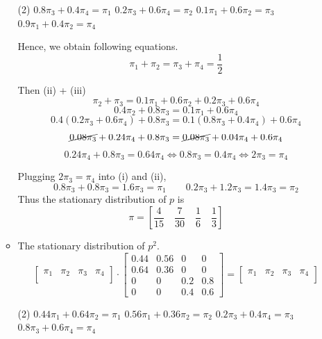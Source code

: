\documentclass[12pt]{article}
\begin{document}
\begin{enumerate}[label=(\alph*)]
\begin{itemize}
            \begin{tasks}(2)
        		\task $0.8\pi_3 + 0.4\pi_4 = \pi_1$
        		\task $0.2\pi_3 + 0.6\pi_4 = \pi_2$
        		\task $0.1\pi_1 + 0.6\pi_2 = \pi_3$
        		\task $0.9\pi_1 + 0.4\pi_2 = \pi_4$
        		
        	\end{tasks}
            
            Hence, we obtain following equations.
            $$\pi_1+\pi_2 = \pi_3+\pi_4 = \frac{1}{2}$$
            
            Then (ii) + (iii)
            $$\pi_2 + \pi_3 = 0.1\pi_1 + 0.6\pi_2 + 0.2\pi_3 + 0.6\pi_4$$
            $$0.4\pi_2 + 0.8\pi_3 = 0.1\pi_1 + 0.6\pi_4$$
            $$0.4(0.2\pi_3 + 0.6\pi_4) + 0.8\pi_3 = 0.1(0.8\pi_3 + 0.4\pi_4) + 0.6\pi_4$$
            $$\cancel{0.08\pi_3} + 0.24\pi_4 + 0.8\pi_3 = \cancel{0.08\pi_3} + 0.04\pi_4 + 0.6\pi_4$$
            $$0.24\pi_4 + 0.8\pi_3 = 0.64\pi_4 \Leftrightarrow 0.8\pi_3 = 0.4\pi_4 
            \Leftrightarrow 2\pi_3 = \pi_4$$
            
            Plugging $2\pi_3 = \pi_4$ into (i) and (ii),
            $$0.8\pi_3 + 0.8\pi_3 = 1.6\pi_3 = \pi_1 \qquad
            0.2\pi_3+1.2\pi_3 = 1.4\pi_3 = \pi_2
            $$
            Thus the stationary distribution of $p$ is
            $$\pi = \left[ \frac{4}{15}\quad \frac{7}{30}\quad \frac{1}{6}\quad \frac{1}{3} \right] $$
            \newpage
            \item The stationary distribution of $p^2$.\\
            
            $$
            \begin{bmatrix}
                \pi_1&\pi_2&\pi_3&\pi_4\\
            \end{bmatrix}
            \cdot 
            \begin{bmatrix}
                0.44&0.56&0&0\\
                0.64&0.36&0&0\\
                0&0&0.2&0.8\\
                0&0&0.4&0.6
            \end{bmatrix}
            =
            \begin{bmatrix}
                \pi_1&\pi_2&\pi_3&\pi_4\\
            \end{bmatrix}   
            $$
            \begin{tasks}(2)
        		\task $0.44\pi_1 + 0.64\pi_2 = \pi_1$
        		\task $0.56\pi_1 + 0.36\pi_2 = \pi_2$
        		\task $0.2\pi_3 + 0.4\pi_4 = \pi_3$
        		\task $0.8\pi_3 + 0.6\pi_4 = \pi_4$
        	\end{tasks}
        

\end{itemize}
\end{enumerate}
\end{document}
